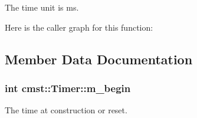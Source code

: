 The time unit is ms. 

Here is the caller graph for this function\+:




\subsection{Member Data Documentation}
\subsubsection[{\texorpdfstring{m\+\_\+begin}{m_begin}}]{\setlength{\rightskip}{0pt plus 5cm}int cmst\+::\+Timer\+::m\+\_\+begin\hspace{0.3cm}{\ttfamily [private]}}\hypertarget{classcmst_1_1_timer_a0fa8671c0b1dc3efca0f4dc5dfe98fc2}{}\label{classcmst_1_1_timer_a0fa8671c0b1dc3efca0f4dc5dfe98fc2}


The time at construction or reset. 

